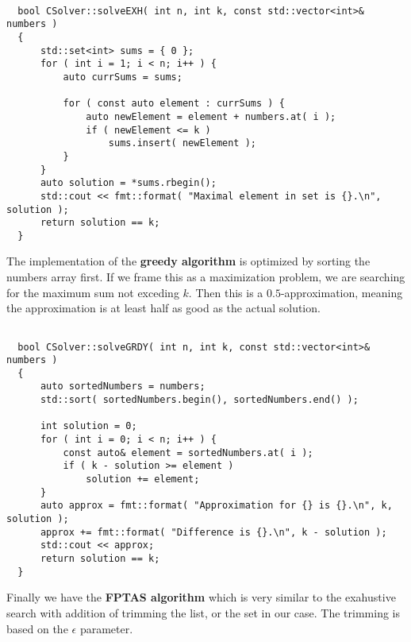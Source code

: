 \documentclass[11pt]{article}
\begin{document}
\begin{verbatim}

  bool CSolver::solveEXH( int n, int k, const std::vector<int>& numbers )
  {
      std::set<int> sums = { 0 };
      for ( int i = 1; i < n; i++ ) {
          auto currSums = sums;
  
          for ( const auto element : currSums ) {
              auto newElement = element + numbers.at( i );
              if ( newElement <= k )
                  sums.insert( newElement );
          }
      }
      auto solution = *sums.rbegin();
      std::cout << fmt::format( "Maximal element in set is {}.\n", solution );
      return solution == k;
  } 
\end{verbatim}

\pagebreak
The implementation of the \textbf{greedy algorithm} is optimized by sorting the numbers array first. If we frame this as a maximization problem, we are searching for the maximum sum not exceding $k$. Then this is a $0.5$-approximation, meaning the approximation is at least half as good as the actual solution.

\begin{verbatim}

  bool CSolver::solveGRDY( int n, int k, const std::vector<int>& numbers )
  {
      auto sortedNumbers = numbers;
      std::sort( sortedNumbers.begin(), sortedNumbers.end() );
  
      int solution = 0;
      for ( int i = 0; i < n; i++ ) {
          const auto& element = sortedNumbers.at( i );
          if ( k - solution >= element )
              solution += element;
      }
      auto approx = fmt::format( "Approximation for {} is {}.\n", k, solution );
      approx += fmt::format( "Difference is {}.\n", k - solution );
      std::cout << approx;
      return solution == k;
  }  
\end{verbatim}

Finally we have the \textbf{FPTAS algorithm} which is very similar to the exahustive search with addition of trimming the list, or the set in our case. The trimming is based on the $\epsilon$ parameter.
\end{document}
